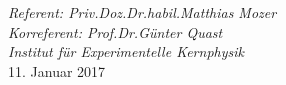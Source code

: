 \begin{titlepage}
\begin{addmargin}[0cm]{0cm}
\begin{center}
{  %
  \large{\textit{Referent: Priv.\;Doz.\;Dr.\;habil.\;Matthias Mozer}}\\
  \large{\textit{Korreferent: Prof.\;Dr.\;G\"unter Quast}}\\
   \vspace{0.2 cm}
\large{\textit{Institut f\"ur Experimentelle Kernphysik}}\\


  \vspace{1.0cm}
  \large{11. Januar 2017}%
}
\end{center}
\end{addmargin}
\end{titlepage}
